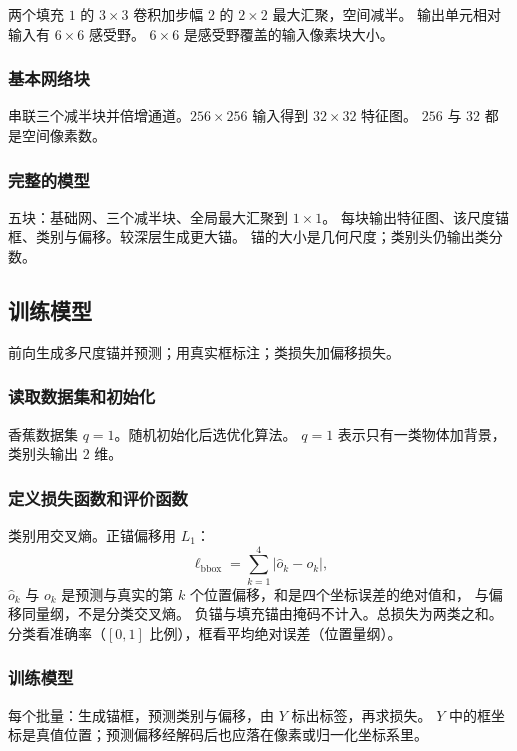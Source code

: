 两个填充 $1$ 的 $3\times 3$ 卷积加步幅 $2$ 的 $2\times 2$ 最大汇聚，空间减半。
输出单元相对输入有 $6\times 6$ 感受野。
$6\times 6$ 是感受野覆盖的输入像素块大小。

\subsubsection{基本网络块}

串联三个减半块并倍增通道。$256\times 256$ 输入得到 $32\times 32$ 特征图。
$256$ 与 $32$ 都是空间像素数。

\subsubsection{完整的模型}

五块：基础网、三个减半块、全局最大汇聚到 $1\times 1$。
每块输出特征图、该尺度锚框、类别与偏移。较深层生成更大锚。
锚的大小是几何尺度；类别头仍输出类分数。

\subsection{训练模型}

前向生成多尺度锚并预测；用真实框标注；类损失加偏移损失。

\subsubsection{读取数据集和初始化}

香蕉数据集 $q=1$。随机初始化后选优化算法。
$q=1$ 表示只有一类物体加背景，类别头输出 $2$ 维。

\subsubsection{定义损失函数和评价函数}

类别用交叉熵。正锚偏移用 $L_1$：
\[
\ell_{\mathrm{bbox}}
=
\sum_{k=1}^{4}\lvert\hat{o}_k-o_k\rvert,
\]
$\hat{o}_k$ 与 $o_k$ 是预测与真实的第 $k$ 个位置偏移，和是四个坐标误差的绝对值和，
与偏移同量纲，不是分类交叉熵。
负锚与填充锚由掩码不计入。总损失为两类之和。分类看准确率（$[0,1]$ 比例），框看平均绝对误差（位置量纲）。

\subsubsection{训练模型}

每个批量：生成锚框，预测类别与偏移，由 $Y$ 标出标签，再求损失。
$Y$ 中的框坐标是真值位置；预测偏移经解码后也应落在像素或归一化坐标系里。

